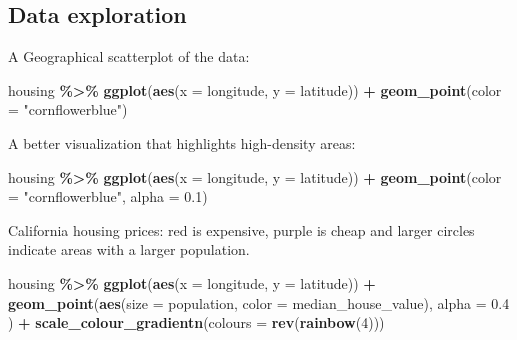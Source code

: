 \documentclass[
]{book}
\newenvironment{Shaded}{\begin{snugshade}}{\end{snugshade}}
\newcommand{\DataTypeTok}[1]{\textcolor[rgb]{0.13,0.29,0.53}{#1}}
\newcommand{\DecValTok}[1]{\textcolor[rgb]{0.00,0.00,0.81}{#1}}
\newcommand{\FloatTok}[1]{\textcolor[rgb]{0.00,0.00,0.81}{#1}}
\newcommand{\KeywordTok}[1]{\textcolor[rgb]{0.13,0.29,0.53}{\textbf{#1}}}
\newcommand{\NormalTok}[1]{#1}
\newcommand{\OperatorTok}[1]{\textcolor[rgb]{0.81,0.36,0.00}{\textbf{#1}}}
\newcommand{\StringTok}[1]{\textcolor[rgb]{0.31,0.60,0.02}{#1}}
\begin{document}
\hypertarget{data-exploration}{%
\subsection{Data exploration}\label{data-exploration}}

A Geographical scatterplot of the data:

\begin{Shaded}
\begin{Highlighting}[]
\NormalTok{housing }\OperatorTok{\%\textgreater{}\%}
\StringTok{  }\KeywordTok{ggplot}\NormalTok{(}\KeywordTok{aes}\NormalTok{(}\DataTypeTok{x =}\NormalTok{ longitude, }\DataTypeTok{y =}\NormalTok{ latitude)) }\OperatorTok{+}
\StringTok{  }\KeywordTok{geom\_point}\NormalTok{(}\DataTypeTok{color =} \StringTok{"cornflowerblue"}\NormalTok{)}
\end{Highlighting}
\end{Shaded}

A better visualization that highlights high-density areas:

\begin{Shaded}
\begin{Highlighting}[]
\NormalTok{housing }\OperatorTok{\%\textgreater{}\%}
\StringTok{  }\KeywordTok{ggplot}\NormalTok{(}\KeywordTok{aes}\NormalTok{(}\DataTypeTok{x =}\NormalTok{ longitude, }\DataTypeTok{y =}\NormalTok{ latitude)) }\OperatorTok{+}
\StringTok{  }\KeywordTok{geom\_point}\NormalTok{(}\DataTypeTok{color =} \StringTok{"cornflowerblue"}\NormalTok{, }\DataTypeTok{alpha =} \FloatTok{0.1}\NormalTok{)}
\end{Highlighting}
\end{Shaded}

California housing prices: red is expensive, purple is cheap and larger circles indicate areas with a larger population.

\begin{Shaded}
\begin{Highlighting}[]
\NormalTok{housing }\OperatorTok{\%\textgreater{}\%}
\StringTok{  }\KeywordTok{ggplot}\NormalTok{(}\KeywordTok{aes}\NormalTok{(}\DataTypeTok{x =}\NormalTok{ longitude, }\DataTypeTok{y =}\NormalTok{ latitude)) }\OperatorTok{+}
\StringTok{  }\KeywordTok{geom\_point}\NormalTok{(}\KeywordTok{aes}\NormalTok{(}\DataTypeTok{size =}\NormalTok{ population, }\DataTypeTok{color =}\NormalTok{ median\_house\_value),}
    \DataTypeTok{alpha =} \FloatTok{0.4}
\NormalTok{  ) }\OperatorTok{+}
\StringTok{  }\KeywordTok{scale\_colour\_gradientn}\NormalTok{(}\DataTypeTok{colours =} \KeywordTok{rev}\NormalTok{(}\KeywordTok{rainbow}\NormalTok{(}\DecValTok{4}\NormalTok{)))}
\end{Highlighting}
\end{Shaded}
\end{document}
